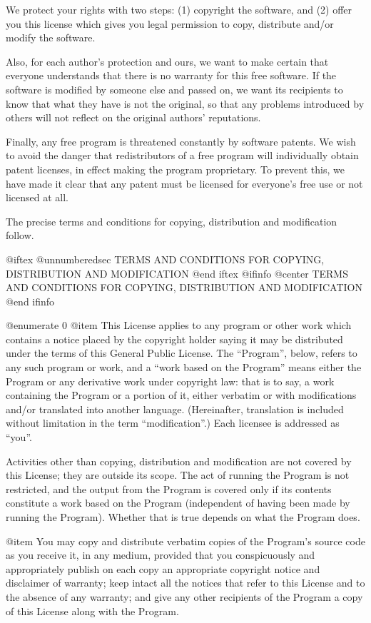   We protect your rights with two steps: (1) copyright the software, and
(2) offer you this license which gives you legal permission to copy,
distribute and/or modify the software.

  Also, for each author's protection and ours, we want to make certain
that everyone understands that there is no warranty for this free
software.  If the software is modified by someone else and passed on, we
want its recipients to know that what they have is not the original, so
that any problems introduced by others will not reflect on the original
authors' reputations.

  Finally, any free program is threatened constantly by software
patents.  We wish to avoid the danger that redistributors of a free
program will individually obtain patent licenses, in effect making the
program proprietary.  To prevent this, we have made it clear that any
patent must be licensed for everyone's free use or not licensed at all.

  The precise terms and conditions for copying, distribution and
modification follow.

@iftex
@unnumberedsec TERMS AND CONDITIONS FOR COPYING, DISTRIBUTION AND MODIFICATION
@end iftex
@ifinfo
@center TERMS AND CONDITIONS FOR COPYING, DISTRIBUTION AND MODIFICATION
@end ifinfo

@enumerate 0
@item
This License applies to any program or other work which contains
a notice placed by the copyright holder saying it may be distributed
under the terms of this General Public License.  The ``Program'', below,
refers to any such program or work, and a ``work based on the Program''
means either the Program or any derivative work under copyright law:
that is to say, a work containing the Program or a portion of it,
either verbatim or with modifications and/or translated into another
language.  (Hereinafter, translation is included without limitation in
the term ``modification''.)  Each licensee is addressed as ``you''.

Activities other than copying, distribution and modification are not
covered by this License; they are outside its scope.  The act of
running the Program is not restricted, and the output from the Program
is covered only if its contents constitute a work based on the
Program (independent of having been made by running the Program).
Whether that is true depends on what the Program does.

@item
You may copy and distribute verbatim copies of the Program's
source code as you receive it, in any medium, provided that you
conspicuously and appropriately publish on each copy an appropriate
copyright notice and disclaimer of warranty; keep intact all the
notices that refer to this License and to the absence of any warranty;
and give any other recipients of the Program a copy of this License
along with the Program.

